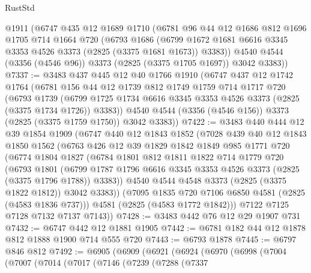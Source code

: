 \begin{lexlean}{RustStd}
\begin{coremodule}
    @1911
    (@6747
      @435
      @12
      @1689
      @1710
      (@6781
        @96
        @44
        @12
        @1686
        @812
        @1696
        @1705
        @714
        @1664
        @720
        (@6793
          @1686
          (@6799 @1672 @1681 @6616 @3345 @3353 @4526 @3373 (@2825 (@3375 @1681 @1673)) @3383))
        @4540
        @4544
        (@3356 (@4546 @96))
        @3373
        (@2825 (@3375 @1705 @1697))
        @3042
        @3383))
@7337 := @3483
    @437
    @445
    @12
    @40
    @1766
    @1910
    (@6747
      @437
      @12
      @1742
      @1764
      (@6781
        @156
        @44
        @12
        @1739
        @812
        @1749
        @1759
        @714
        @1717
        @720
        (@6793
          @1739
          (@6799 @1725 @1734 @6616 @3345 @3353 @4526 @3373 (@2825 (@3375 @1734 @1726)) @3383))
        @4540
        @4544
        (@3356 (@4546 @156))
        @3373
        (@2825 (@3375 @1759 @1750))
        @3042
        @3383))
@7422 := @3483
    @440
    @444
    @12
    @39
    @1854
    @1909
    (@6747
      @440
      @12
      @1843
      @1852
      (@7028
        @439
        @40
        @12
        @1843
        @1850
        @1562
        (@6763
          @426
          @12
          @39
          @1829
          @1842
          @1849
          @985
          @1771
          @720
          (@6774
            @1804
            @1827
            (@6784
              @1801
              @812
              @1811
              @1822
              @714
              @1779
              @720
              (@6793
                @1801
                (@6799 @1787 @1796 @6616 @3345 @3353 @4526 @3373 (@2825 (@3375 @1796 @1788)) @3383))
              @4540
              @4544
              @4548
              @3373
              (@2825 (@3375 @1822 @1812))
              @3042
              @3383))
          (@7095 @1835 @720 @7106 @6850 @4581 (@2825 (@4583 @1836 @737)))
          @4581
          (@2825 (@4583 @1772 @1842)))
        @7122
        @7125
        @7128
        @7132
        @7137
        @7143))
@7428 := @3483 @442 @76 @12 @29 @1907 @731
@7432 := @6747 @442 @12 @1881 @1905
@7442 := @6781 @182 @44 @12 @1878 @812 @1888 @1900 @714 @555 @720
@7443 := @6793 @1878
@7445 := @6797 @846 @812
@7492 := @6905
    (@6909
      (@6921
        (@6924
          (@6970
            (@6998
              (@7004
                (@7007
                  (@7014
                    (@7017
                      (@7146
                        (@7239
                          (@7288
                            (@7337

\end{coremodule}
\end{lexlean}
